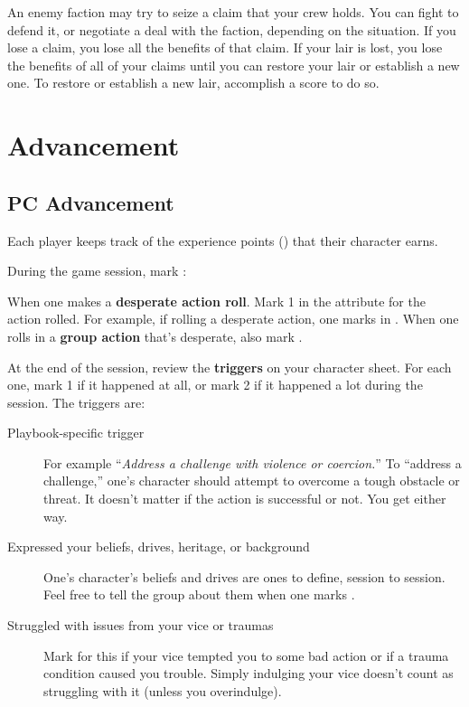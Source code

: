 An enemy faction may try to seize a claim that your crew holds. You can fight to defend it, or negotiate a deal with the faction, depending on the situation. If you lose a claim, you lose all the benefits of that claim. If your lair is lost, you lose the benefits of all of your claims until you can restore your lair or establish a new one. To restore or establish a new lair, accomplish a score to do so.

\section{Advancement}


\subsection{PC Advancement}

Each player keeps track of the experience points () that their character earns.

During the game session, mark :

    When one makes a \textbf{desperate action roll}. Mark 1  in the attribute for the action rolled. For example, if rolling a desperate  action, one marks  in . When one rolls in a \textbf{group action} that’s desperate, also mark .

At the end of the session, review the  \textbf{triggers} on your character sheet. For each one, mark 1  if it happened at all, or mark 2  if it happened a lot during the session. The  triggers are:

\begin{description}
\item[Playbook-specific  trigger] For example ``\textit{Address a challenge with violence or coercion.}'' To ``address a challenge,'' one's character should attempt to overcome a tough obstacle or threat. It doesn’t matter if the action is successful or not. You get  either way.
\item[Expressed your beliefs, drives, heritage, or background] One's character’s beliefs and drives are ones to define, session to session. Feel free to tell the group about them when one marks .
\item[Struggled with issues from your vice or traumas] Mark  for this if your vice tempted you to some bad action or if a trauma condition caused you trouble. Simply indulging your vice doesn’t count as struggling with it (unless you overindulge).
\end{description}

